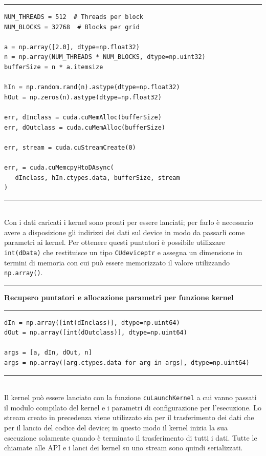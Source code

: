 \documentclass[12pt,a4paper]{report}
\begin{document}
\noindent\rule[0.5ex]{\linewidth}{1pt}
\begin{lstlisting}
NUM_THREADS = 512  # Threads per block
NUM_BLOCKS = 32768  # Blocks per grid

a = np.array([2.0], dtype=np.float32)
n = np.array(NUM_THREADS * NUM_BLOCKS, dtype=np.uint32)
bufferSize = n * a.itemsize

hIn = np.random.rand(n).astype(dtype=np.float32)
hOut = np.zeros(n).astype(dtype=np.float32)

err, dInclass = cuda.cuMemAlloc(bufferSize)
err, dOutclass = cuda.cuMemAlloc(bufferSize)

err, stream = cuda.cuStreamCreate(0)

err, = cuda.cuMemcpyHtoDAsync(
   dInclass, hIn.ctypes.data, bufferSize, stream
)

\end{lstlisting}
\noindent\rule[0.5ex]{\linewidth}{1pt} \\[10pt]
Con i dati caricati i kernel sono pronti per essere lanciati; per farlo è necessario avere a disposizione gli indirizzi dei dati sul device in modo da passarli come parametri ai kernel. Per ottenere questi puntatori è possibile utilizzare \verb|int(dData)| che restituisce un tipo \verb|CUdeviceptr| e assegna un dimensione in termini di memoria con cui può essere memorizzato il valore utilizzando \verb|np.array()|. \newpage

\noindent\rule[0.5ex]{\linewidth}{2pt}
\small{\textbf{Recupero puntatori e allocazione parametri per funzione kernel}} \\
\noindent\rule[0.5ex]{\linewidth}{1pt}
\begin{lstlisting}
dIn = np.array([int(dInclass)], dtype=np.uint64)
dOut = np.array([int(dOutclass)], dtype=np.uint64)

args = [a, dIn, dOut, n]
args = np.array([arg.ctypes.data for arg in args], dtype=np.uint64)
\end{lstlisting}
\noindent\rule[0.5ex]{\linewidth}{1pt} \\[10pt]
Il kernel può essere lanciato con la funzione \verb|cuLaunchKernel| a cui vanno passati il modulo compilato del kernel e i parametri di configurazione per l'esecuzione. Lo stream creato in precedenza viene utilizzato sia per il trasferimento dei dati che per il lancio del codice del device; in questo modo il kernel inizia la sua esecuzione solamente quando è terminato il trasferimento di tutti i dati. Tutte le chiamate alle API e i lanci dei kernel su uno stream sono quindi serializzati.\newline
\end{document}
